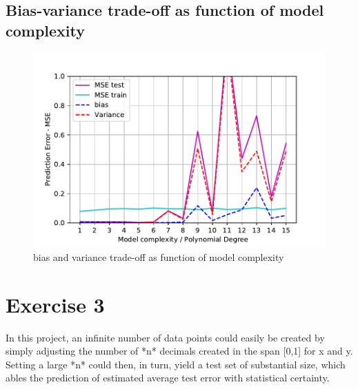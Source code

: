 \documentclass[11pt, a4paper]{article}
\begin{document}



\subsection*{Bias-variance trade-off as function of model complexity}

\begin{figure}[h]
  \centering
  \includegraphics[scale=0.75]{figures/EX2_model_complexity_using_bootstrap_function.pdf}
  \caption{\label{fig:?}bias and variance trade-off as function of model complexity}
\end{figure}

\section*{Exercise 3}
In this project, an infinite number of data points could easily be created by simply adjusting the number of *n* decimals created in the span [0,1] for x and y. Setting a large *n* could then, in turn, yield a test set of substantial size, which ables the prediction of estimated average test error with statistical certainty. 
\end{document}
